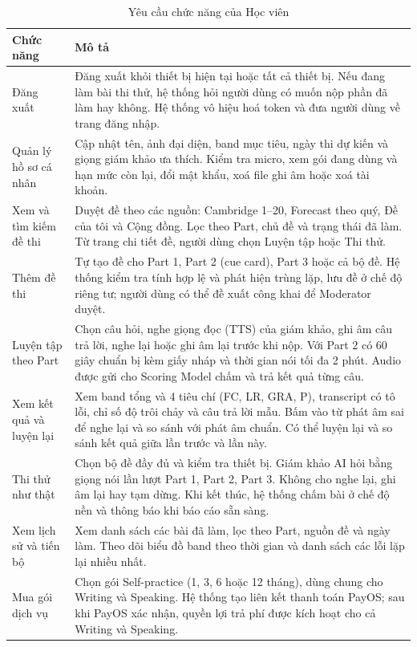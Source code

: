 \begin{table}[H]
\centering
\caption{Yêu cầu chức năng của Học viên}
\label{wispace:tab:func_student}
\small
\begin{tabular}{|p{4.2cm}|p{\dimexpr\linewidth-4.2cm-4\tabcolsep-3\arrayrulewidth\relax}|}
\hline
\textbf{Chức năng} & \textbf{Mô tả} \\
\hline
Đăng xuất & Đăng xuất khỏi thiết bị hiện tại hoặc tất cả thiết bị. Nếu đang làm bài thi thử, hệ thống hỏi người dùng có muốn nộp phần đã làm hay không. Hệ thống vô hiệu hoá token và đưa người dùng về trang đăng nhập. \\
\hline
Quản lý hồ sơ cá nhân & Cập nhật tên, ảnh đại diện, band mục tiêu, ngày thi dự kiến và giọng giám khảo ưa thích. Kiểm tra micro, xem gói đang dùng và hạn mức còn lại, đổi mật khẩu, xoá file ghi âm hoặc xoá tài khoản. \\
\hline
Xem và tìm kiếm đề thi & Duyệt đề theo các nguồn: Cambridge 1--20, Forecast theo quý, Đề của tôi và Cộng đồng. Lọc theo Part, chủ đề và trạng thái đã làm. Từ trang chi tiết đề, người dùng chọn Luyện tập hoặc Thi thử. \\
\hline
Thêm đề thi & Tự tạo đề cho Part 1, Part 2 (cue card), Part 3 hoặc cả bộ đề. Hệ thống kiểm tra tính hợp lệ và phát hiện trùng lặp, lưu đề ở chế độ riêng tư; người dùng có thể đề xuất công khai để Moderator duyệt. \\
\hline
Luyện tập theo Part & Chọn câu hỏi, nghe giọng đọc (TTS) của giám khảo, ghi âm câu trả lời, nghe lại hoặc ghi âm lại trước khi nộp. Với Part 2 có 60 giây chuẩn bị kèm giấy nháp và thời gian nói tối đa 2 phút. Audio được gửi cho Scoring Model chấm và trả kết quả từng câu. \\
\hline
Xem kết quả và luyện lại & Xem band tổng và 4 tiêu chí (FC, LR, GRA, P), transcript có tô lỗi, chỉ số độ trôi chảy và câu trả lời mẫu. Bấm vào từ phát âm sai để nghe lại và so sánh với phát âm chuẩn. Có thể luyện lại và so sánh kết quả giữa lần trước và lần này. \\
\hline
Thi thử như thật & Chọn bộ đề đầy đủ và kiểm tra thiết bị. Giám khảo AI hỏi bằng giọng nói lần lượt Part 1, Part 2, Part 3. Không cho nghe lại, ghi âm lại hay tạm dừng. Khi kết thúc, hệ thống chấm bài ở chế độ nền và thông báo khi báo cáo sẵn sàng. \\
\hline
Xem lịch sử và tiến bộ & Xem danh sách các bài đã làm, lọc theo Part, nguồn đề và ngày làm. Theo dõi biểu đồ band theo thời gian và danh sách các lỗi lặp lại nhiều nhất. \\
\hline
Mua gói dịch vụ & Chọn gói Self-practice (1, 3, 6 hoặc 12 tháng), dùng chung cho Writing và Speaking. Hệ thống tạo liên kết thanh toán PayOS; sau khi PayOS xác nhận, quyền lợi trả phí được kích hoạt cho cả Writing và Speaking. \\
\hline
\end{tabular}
\end{table}


